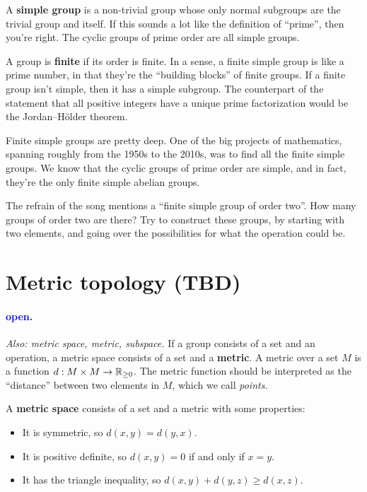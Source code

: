 \documentclass[11pt,paper=letter]{scrartcl}
\renewcommand{\bluebf}[1]{{\bfseries \color{Blue} #1}}
\renewcommand\wp[1]{\paragraph{\textcolor{Blue}{#1.}} \hspace{-1em}}
\newcommand\wl[1]{\label{w:#1}}
\newcommand\oww[1]{\textit{Also: #1.}}
\begin{document}
A \bluebf{simple group} is a non-trivial group whose only normal subgroups are the trivial group and itself. If this sounds a lot like the definition of ``prime'', then you're right. The cyclic groups of prime order are all simple groups.

A group is \bluebf{finite} if its order is finite. In a sense, a finite simple group is like a prime number, in that they're the ``building blocks'' of finite groups. If a finite group isn't simple, then it has a simple subgroup. The counterpart of the statement that all positive integers have a unique prime factorization would be the Jordan--H\"older theorem.

Finite simple groups are pretty deep. One of the big projects of mathematics, spanning roughly from the 1950s to the 2010s, was to find all the finite simple groups. We know that the cyclic groups of prime order are simple, and in fact, they're the only finite simple abelian groups.

\begin{exrboxed}
  The refrain of the song mentions a ``finite simple group of order two''. How many groups of order two are there? Try to construct these groups, by starting with two elements, and going over the possibilities for what the operation could be.
\end{exrboxed}

\section{Metric topology (TBD)}

\wp{open}
\wl{open}
\oww{metric space, metric, subspace}
If a group consists of a set and an operation, a metric space consists of a set and a \textbf{metric}. A metric over a set $M$ is a function $d : M \times M \to \mathbb R_{\geq 0} $. The metric function should be interpreted as the ``distance'' between two elements in $M$, which we call \textit{points}.

A \textbf{metric space} consists of a set and a metric with some properties:

\begin{itemize}
  \item It is symmetric, so $d(x, y) = d(y ,x)$.
  \item It is positive definite, so $d(x, y) = 0$ if and only if $x = y$.
  \item It has the triangle inequality, so $d(x, y) + d(y, z) \ge d(x, z)$.
\end{itemize}
\end{document}
